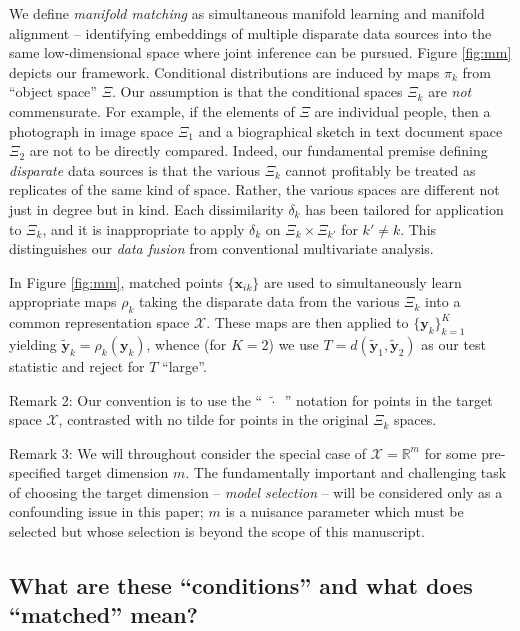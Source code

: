 \documentclass[12pt,xcolor]{article}
\newcommand{\1}{\ensuremath{\mbox{{\bf 1}}}}
\begin{document}
We define {\em manifold matching}
as simultaneous manifold learning and manifold alignment --
identifying embeddings of multiple disparate data sources into the same low-dimensional space
where joint inference can be pursued.
Figure \ref{fig:mm} depicts our framework.
Conditional distributions are induced by maps $\pi_k$ from ``object space'' $\Xi$.
Our assumption is that the conditional spaces $\Xi_k$ are {\em not} commensurate.
For example, if the elements of $\Xi$ are individual people, then a photograph in image space $\Xi_1$
and a biographical sketch in text document space $\Xi_2$ are not to be directly compared.
Indeed, our fundamental premise defining {\em disparate} data sources is that
the various $\Xi_k$ cannot profitably be treated as replicates of the same kind of space.
Rather, the various spaces are different not just in degree but in kind.
Each dissimilarity $\delta_k$ has been tailored for application to $\Xi_k$,
and it is inappropriate to apply $\delta_{k}$ on $\Xi_k \times \Xi_{k'}$ for $k' \neq k$.
This distinguishes our {\em data fusion} from conventional multivariate analysis.

In Figure \ref{fig:mm},
matched points $\{\bm{x}_{ik}\}$ are used to simultaneously learn appropriate maps $\rho_k$
taking the disparate data from the various $\Xi_k$ into a common representation space $\mathcal{X}$.
These maps are then applied to $\{\bm{y}_k\}_{k=1}^K$
yielding $\widetilde{\bm{y}}_k = \rho_k(\bm{y}_k)$,
whence (for $K=2$) we use $T=d(\widetilde{\bm{y}}_1,\widetilde{\bm{y}}_2)$
as our test statistic and reject for $T$ ``large''.

Remark 2: Our convention is to use the ``~$\widetilde{\cdot}$~'' notation for points in the target space $\mathcal{X}$,
contrasted with no tilde for points in the original $\Xi_k$ spaces.


Remark 3: We will throughout consider the special case of $\mathcal{X} = \mathbb{R}^m$
for some pre-specified target dimension $m$.
The fundamentally important and challenging task of choosing the target dimension --
{\em model selection} -- will be considered only as a confounding issue in this paper;
$m$ is a nuisance parameter which must be selected but whose selection is beyond the scope of this manuscript.

\subsection{What are these ``conditions'' and what does ``matched'' mean?}
\end{document}
